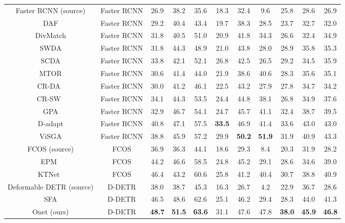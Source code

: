 \documentclass[sigconf]{acmart}
\begin{document}
\begin{table*}[t]
\begin{tabular}{c|c|cccccccc|c}
                \hline
                Faster RCNN (source) & Faster RCNN & 26.9 & 38.2 & 35.6 & 18.3 & 32.4 & 9.6 & 25.8 & 28.6 & 26.9 \\
                DAF \cite{dafaster} & Faster RCNN & 29.2 & 40.4 & 43.4 & 19.7 & 38.3 & 28.5 & 23.7 & 32.7 & 32.0 \\
                DivMatch \cite{divmatch} & Faster RCNN & 31.8 & 40.5 & 51.0 & 20.9 & 41.8 & 34.3 & 26.6 & 32.4 & 34.9 \\
                SWDA \cite{strong-weak} & Faster RCNN & 31.8 & 44.3 & 48.9 & 21.0 & 43.8 & 28.0 & 28.9 & 35.8 & 35.3 \\
                SCDA \cite{scda} & Faster RCNN & 33.8 & 42.1 & 52.1 & 26.8 & 42.5 & 26.5 & 29.2 & 34.5 & 35.9 \\
                MTOR \cite{mtor} & Faster RCNN & 30.6 & 41.4 & 44.0 & 21.9 & 38.6 & 40.6 & 28.3 & 35.6 & 35.1 \\
                CR-DA~\cite{xu2020exploring} & Faster RCNN & 30.0 & 41.2 & 46.1 & 22.5 & 43.2 & 27.9 & 27.8 & 34.7 & 34.2 \\
                CR-SW~\cite{xu2020exploring} & Faster RCNN & 34.1 & 44.3 & 53.5 & 24.4 & 44.8 & 38.1 & 26.8 & 34.9 & 37.6 \\
                GPA \cite{gpadet} & Faster RCNN & 32.9 & 46.7 & 54.1 & 24.7 & 45.7 & 41.1 & 32.4 & 38.7 & 39.5 \\
                D-adapt \cite{jiang2021decoupled} & Faster RCNN & 40.8 & 47.1 & 57.5 & \textbf{33.5} & 46.9 & 41.4 & 33.6 & 43.0 & 43.0 \\
                ViSGA \cite{ViSGA} & Faster RCNN & 38.8 & 45.9 & 57.2 & 29.9 & \textbf{50.2} & \textbf{51.9} & 31.9 & 40.9 & 43.3 \\
                \hline
                FCOS \cite{tian2019fcos} (source) & FCOS & 36.9 & 36.3 & 44.1 & 18.6 & 29.3 & 8.4 & 20.3 & 31.9 & 28.2 \\
                EPM~\cite{hsu2020every} & FCOS & 44.2 & 46.6 & 58.5 & 24.8 & 45.2 & 29.1 & 28.6 & 34.6 & 39.0 \\
                KTNet~\cite{KTNet} & FCOS & 46.4 & 43.2 & 60.6 & 25.8 & 41.2 &40.4 & 30.7 & 38.8 & 40.9 \\
                \hline
                Deformable DETR (source) & D-DETR & 38.0 & 38.7 & 45.3 & 16.3 & 26.7 & 4.2 & 22.9 & 36.7  & 28.6 \\
                SFA \cite{wang2021exploring} & D-DETR & 46.5 & 48.6 & 62.6 & 25.1 & 46.2 & 29.4 & 28.3 & 44.0 & 41.3 \\
                Onet (ours) & D-DETR & \textbf{48.7} & \textbf{51.5} & \textbf{63.6} & 31.1 & 47.6 & 47.8 & \textbf{38.0} & \textbf{45.9} & \textbf{46.8} \\
                \bottomrule[1.0pt]
            \end{tabular}
\vspace{-2mm}
\end{table*}
    
\end{document}
